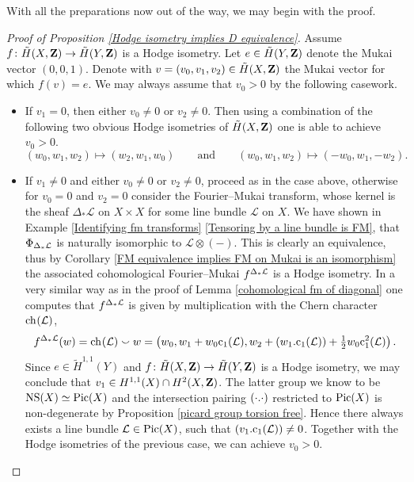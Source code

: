 \noindent
With all the preparations now out of the way, we may begin with the proof.
\begin{proof}[Proof of Proposition \ref{Hodge isometry implies D equivalence}]
    Assume $f \colon \,\tilde{\!{H}}(X, \mathbf Z) \to \,\tilde{\!{H}}(Y, \mathbf Z)$ is a Hodge isometry. Let $e \in \,\tilde{\!{H}}(Y, \mathbf Z)$ denote the Mukai vector $(0,0,1)$. Denote with $v =(v_0, v_1, v_2) \in \,\tilde{\!{H}}(X, \mathbf Z)$ the Mukai vector for which $f(v) = e$. We may always assume that $v_0 > 0$ by the following casework.
    \begin{itemize}[label = $\circ$]
        \item If $v_1 = 0$, then either $v_0 \neq 0$ or $v_2 \neq 0$. Then using a combination of the following two obvious Hodge isometries of $\,\tilde{\!{H}}(X, \mathbf Z)$ one is able to achieve $v_0 > 0$. 
        \[
            (w_0, w_1, w_2) \mapsto (w_2, w_1, w_0) \qquad \text{and} \qquad (w_0, w_1, w_2) \mapsto (-w_0, w_1, -w_2).
        \]
        \item If $v_1 \neq 0$ and either $v_0 \neq 0$ or $v_2 \neq 0$, proceed as in the case above, otherwise for $v_0 = 0$ and $v_2 = 0$ consider the Fourier--Mukai transform, whose kernel is the sheaf $\Delta_*\mathcal L$ on $X \times X$ for some line bundle $\mathcal L$ on $X$. We have shown in Example \ref{Identifying fm transforms} \ref{Tensoring by a line bundle is FM}, that $\Phi_{\Delta_*\mathcal L}$ is naturally isomorphic to $\mathcal L \otimes (-)$. This is clearly an equivalence, thus by Corollary \ref{FM equivalence implies FM on Mukai is an isomorphism} the associated cohomological Fourier--Mukai $f^{\Delta_*\mathcal L}$ is a Hodge isometry. In a very similar way as in the proof of Lemma \ref{cohomological fm of diagonal} one computes that $f^{\Delta_*\mathcal L}$ is given by multiplication with the Chern character $\ch[](\mathcal L)$, \ie
        \[
            \fmcoh{\Delta_*\mathcal{L}}(w) = \ch[](\mathcal L) \smallsmile w = \left(w_0, w_1 + w_0 \cclass[1](\mathcal L), w_2 + \intersect{w_1}{\cclass[1](\mathcal L)} + \tfrac{1}{2}w_0\cclass[1]^2(\mathcal L)\right).
        \]
        Since $e \in \widetilde{H}^{1,1}(Y)$ and $f \colon \,\tilde{\!{H}}(X, \mathbf Z) \to \,\tilde{\!{H}}(Y, \mathbf Z)$ is a Hodge isometry, we may conclude that $v_1 \in H^{1,1}(X) \cap H^{2}(X, \mathbf Z)$. The latter group we know to be $\operatorname{NS}(X) \simeq \operatorname{Pic}(X)$ and the intersection pairing $(\cdot.\cdot)$ restricted to $\operatorname{Pic}(X)$ is non-degenerate by Proposition \ref{picard group torsion free}. Hence there always exists a line bundle $\mathcal L \in \operatorname{Pic}(X)$, such that $\intersect{v_1}{\cclass[1](\mathcal L)} \neq 0$. Together with the Hodge isometries of the previous case, we can achieve $v_0 > 0$. 

\end{itemize}
\end{proof}
